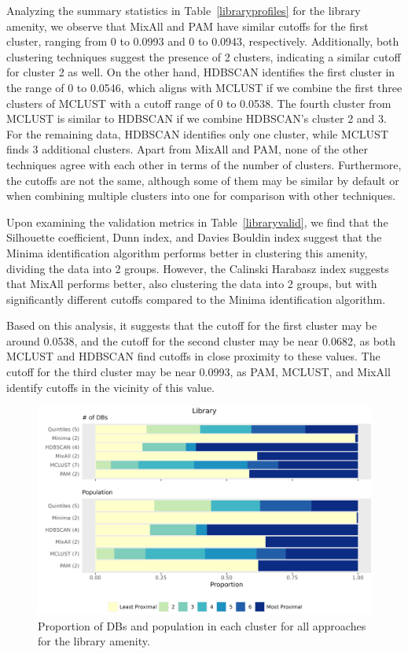\documentclass[11pt, a4paper]{article}
\begin{document}
Analyzing the summary statistics in Table~\ref{libraryprofiles} for the library amenity, we observe that MixAll and PAM have similar cutoffs for the first cluster, ranging from 0 to 0.0993 and 0 to 0.0943, respectively. Additionally, both clustering techniques suggest the presence of 2 clusters, indicating a similar cutoff for cluster 2 as well. On the other hand, HDBSCAN identifies the first cluster in the range of 0 to 0.0546, which aligns with MCLUST if we combine the first three clusters of MCLUST with a cutoff range of 0 to 0.0538. The fourth cluster from MCLUST is similar to HDBSCAN if we combine HDBSCAN's cluster 2 and 3. For the remaining data, HDBSCAN identifies only one cluster, while MCLUST finds 3 additional clusters. Apart from MixAll and PAM, none of the other techniques agree with each other in terms of the number of clusters. Furthermore, the cutoffs are not the same, although some of them may be similar by default or when combining multiple clusters into one for comparison with other techniques.
\par
Upon examining the validation metrics in Table~\ref{libraryvalid}, we find that the Silhouette coefficient, Dunn index, and Davies Bouldin index suggest that the Minima identification algorithm performs better in clustering this amenity, dividing the data into 2 groups. However, the Calinski Harabasz index suggests that MixAll performs better, also clustering the data into 2 groups, but with significantly different cutoffs compared to the Minima identification algorithm.
\par
Based on this analysis, it suggests that the cutoff for the first cluster may be around 0.0538, and the cutoff for the second cluster may be near 0.0682, as both MCLUST and HDBSCAN find cutoffs in close proximity to these values. The cutoff for the third cluster may be near 0.0993, as PAM, MCLUST, and MixAll identify cutoffs in the vicinity of this value.



\begin{figure}[H]
\centering
\includegraphics[width=\textwidth]{./barplot_comparison/Library_barplot.png}
\caption[Library profile barplot]{Proportion of DBs and population in each cluster for all approaches for the library amenity.}\label{librarybarplot}
\end{figure}
\end{document}
